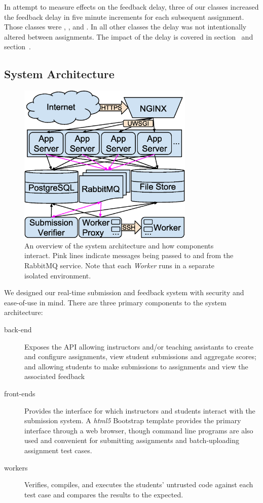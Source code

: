 In attempt to measure effects on the feedback delay, three of our classes
increased the feedback delay in five minute increments for each subsequent
assignment. Those classes were , , and . In
all other classes the delay was not intentionally altered between
assignments. The impact of the delay is covered in
section~ and section~.


\subsection{System Architecture}

\begin{figure}[!t]
\centering \includegraphics[width=3.3in]{graphs/architecture.eps}
\caption{An overview of the system architecture and how components
  interact. Pink lines indicate messages being passed to and from the RabbitMQ
  service. Note that each \emph{Worker} runs in a separate isolated
  environment.}
\end{figure}

We designed our real-time submission and feedback system with security and
ease-of-use in mind. There are three primary components to the system
architecture:

\begin{description}
\item[back-end] Exposes the API allowing instructors and/or teaching assistants
  to create and configure assignments, view student submissions and aggregate
  scores; and allowing students to make submissions to assignments and view the
  associated feedback
\item[front-ends] Provides the interface for which instructors and students
  interact with the submission system. A \emph{html5} Bootstrap template
  provides the primary interface through a web browser, though command line
  programs are also used and convenient for submitting assignments and
  batch-uploading assignment test cases.
\item[workers] Verifies, compiles, and executes the students' untrusted code
  against each test case and compares the results to the expected.
\end{description}

